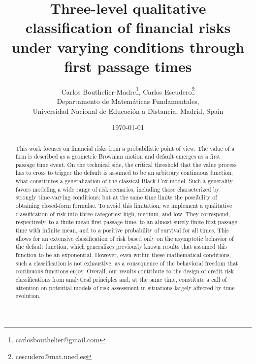 \documentclass[12pt]{article}
\theoremstyle{definition}
\begin{document}
\title{Three-level qualitative classification of financial risks under varying conditions through first passage times}


\setlength{\droptitle}{-2cm}  %
\author{
  Carlos Bouthelier-Madre\thanks{carlosbouthelier@gmail.com},
  Carlos Escudero\thanks{cescudero@mat.uned.es} \\
  \small Departamento de Matem\'aticas Fundamentales,\\ \small Universidad Nacional de Educaci\'on a Distancia, Madrid, Spain
}
\date{\today} %
\maketitle
\vspace{-0.5 cm}
%
\begin{abstract}
This work focuses on financial risks from a probabilistic point of view. The value of a firm is described as a geometric Brownian motion and default emerges as a first passage time event. On the technical side, the critical threshold that the value process has to cross to trigger the default is assumed to be an arbitrary continuous function, what constitutes a generalization of the classical Black-Cox model. Such a generality favors modeling a wide range of risk scenarios, including those characterized by strongly time-varying conditions; but at the same time limits the possibility of obtaining closed-form formulae. To avoid this limitation, we implement a qualitative classification of risk into three categories: high, medium, and low. They correspond, respectively, to a finite mean first passage time, to an almost surely finite first passage time with infinite mean, and to a positive probability of survival for all times. This allows for an extensive classification of risk based only on the asymptotic behavior of the default function, which generalizes previously known results that assumed this function to be an exponential. However, even within these mathematical conditions, such a classification is not exhaustive, as a consequence of the behavioral freedom that continuous functions enjoy. Overall, our results contribute to the design of credit risk classifications from analytical principles and, at the same time, constitute a call of attention on potential models of risk assessment in situations largely affected by time evolution.
\end{abstract}
\end{document}
